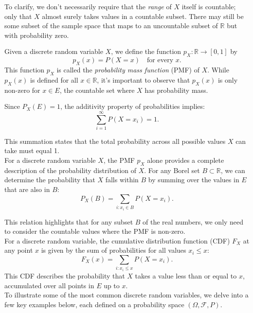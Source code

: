 To clarify, we don’t necessarily require that the \textit{range} of \( X \) itself is countable; only that \( X \) almost surely takes values in a countable subset. There may still be some subset of the sample space that maps to an uncountable subset of \( \mathbb{R} \) but with probability zero.\\

\begin{definition}
    Given a discrete random variable \( X \), we define the function \( p_X: \mathbb{R} \to [0, 1] \) by
\[
p_X(x) = P(X = x) \quad \text{for every } x.
\]
This function \( p_X \) is called the \textit{probability mass function} (PMF) of \( X \). While \( p_X(x) \) is defined for all \( x \in \mathbb{R} \), it’s important to observe that \( p_X(x) \) is only non-zero for \( x \in E \), the countable set where \( X \) has probability mass.
\end{definition}

Since \( P_X(E) = 1 \), the additivity property of probabilities implies:
\[
\sum_{i=1}^{\infty} P(X = x_i) = 1.
\]

This summation states that the total probability across all possible values \( X \) can take must equal 1.\\

For a discrete random variable \( X \), the PMF \( p_X \) alone provides a complete description of the probability distribution of \( X \). For any Borel set \( B \subset \mathbb{R} \), we can determine the probability that \( X \) falls within \( B \) by summing over the values in \( E \) that are also in \( B \):
\[
P_X(B) = \sum_{i : x_i \in B} P(X = x_i).
\]

This relation highlights that for any subset \( B \) of the real numbers, we only need to consider the countable values where the PMF is non-zero.\\

For a discrete random variable, the cumulative distribution function (CDF) \( F_X \) at any point \( x \) is given by the sum of probabilities for all values \( x_i \leq x \):
\[
F_X(x) = \sum_{i : x_i \leq x} P(X = x_i).
\]
This CDF describes the probability that \( X \) takes a value less than or equal to \( x \), accumulated over all points in \( E \) up to \( x \).\\

To illustrate some of the most common discrete random variables, we delve into a few key examples below, each defined on a probability space \((\Omega, \mathcal{F}, P)\).\\

